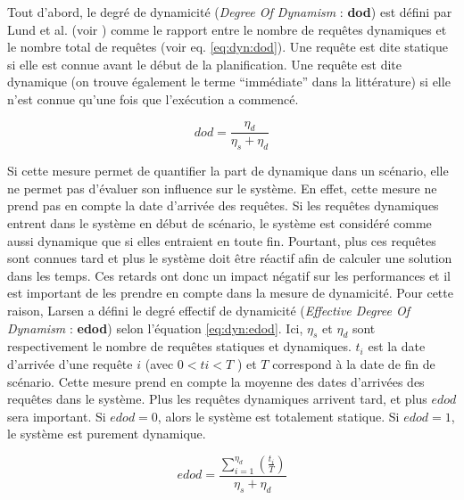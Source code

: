 Tout d’abord, le degré de dynamicité (\textit{Degree Of Dynamism} : \textbf{dod}) est défini par Lund et al. (voir \cite{Lund1996}) comme le rapport entre le nombre de requêtes dynamiques et le nombre total de requêtes (voir eq. \ref{eq:dyn:dod}). Une requête est dite statique si elle est connue avant le début de la planification. Une requête est dite dynamique (on trouve également le terme ``immédiate'' dans la littérature) si elle n'est connue qu'une fois que l'exécution a commencé.
\begin{figure*}[h]
 \begin{equation}
    \label{eq:dyn:dod}
    dod = \frac{\eta_d}{\eta_s+\eta_d}
 \end{equation}
\end{figure*} 

Si cette mesure permet de quantifier la part de dynamique dans un scénario, elle ne permet pas d'évaluer son influence sur le système. En effet, cette mesure ne prend pas en compte la date d’arrivée des requêtes. Si les requêtes dynamiques entrent dans le système en début de scénario, le système est considéré comme aussi dynamique que si elles entraient en toute fin. Pourtant, plus ces requêtes sont connues tard et plus le système doit être réactif afin de calculer une solution dans les temps. Ces retards ont donc un impact négatif sur les performances et il est important de les prendre en compte dans la mesure de dynamicité. Pour cette raison, Larsen a défini le degré effectif de dynamicité (\textit{Effective Degree Of Dynamism} : \textbf{edod}) selon l'équation \ref{eq:dyn:edod}.
Ici, $\eta_s$ et $\eta_d$ sont respectivement le nombre de requêtes statiques et dynamiques. $t_i$ est la date d’arrivée d’une requête $i$ (avec $0 < ti < T$ ) et $T$ correspond à la date de fin de scénario. Cette
mesure prend en compte la moyenne des dates d’arrivées des requêtes dans le système. Plus les requêtes dynamiques arrivent tard, et plus $edod$ sera important. Si $edod = 0$, alors le système est totalement statique. Si $edod = 1$, le système est purement dynamique.
\begin{figure*}[h]
 \begin{equation}
    \label{eq:dyn:edod}
    edod = \frac{\sum \limits_{i=1}^{\eta_d}\left( \frac{t_i}{T} \right)}{\eta_s+\eta_d}
 \end{equation}
\end{figure*}

